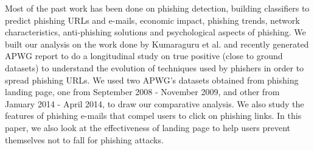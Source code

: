 \documentclass[conference]{IEEEtran}
\begin{document}
\newline
\indent
Most of the past work has been done on phishing detection, building classifiers to predict phishing URLs and e-mails, economic impact, phishing trends, network characteristics, anti-phishing solutions and psychological aspects of phishing. We built our analysis on the work done by Kumaraguru et al. \cite{pk-404} and recently generated APWG report \cite{apwg} to do a longitudinal study on true positive (close to ground datasets) to understand the evolution of techniques used by phishers in order to spread phishing URLs. We used two APWG's datasets obtained from phishing landing page, one from September 2008 - November 2009, and other from January 2014 - April 2014, to draw our comparative analysis. We also study the features of phishing e-mails that compel users to click on phishing links. In this paper, we also look at the effectiveness of landing page to help users prevent themselves not to fall for phishing attacks.
\end{document}

